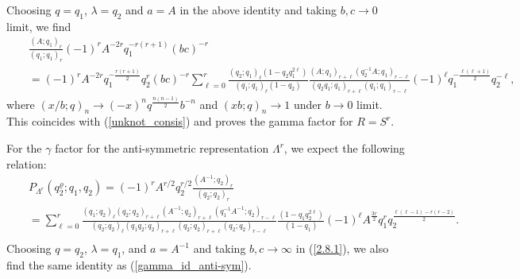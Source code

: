 \documentclass[hyper,letterpaper]{JHEP3}
\begin{document}
Choosing $q=q_1$, $\lambda=q_2$ and $a=A$ in the above identity and
taking $b,c\to 0$ limit, we find
\begin{eqnarray}
&&\frac{(A;q_1)_r}{(q_1;q_1)_r}(-1)^rA^{-2r}q_1^{-r(r+1)}(bc)^{-r}
\nonumber \\
&&=(-1)^rA^{-2r}q_1^{-\frac{r(r+1)}{2}}q_2^{r}(bc)^{-r}
\sum_{\ell=0}^r\frac{(q_2;q_1)_{\ell}(1-q_2q_1^{2\ell})}{(q_1;q_1)_{\ell}(1-q_2)}
\frac{(A;q_1)_{r+\ell}(q_2^{-1}A;q_1)_{r-\ell}}{(q_2q_1;q_1)_{r+\ell}(q_1;q_1)_{r-\ell}}
(-1)^{\ell}q_1^{-\frac{\ell(\ell+1)}{2}}q_2^{-\ell},
\nonumber
\end{eqnarray}
where $(x/b;q)_n\to (-x)^nq^{\frac{n(n-1)}{2}}b^{-n}$ and $(xb;q)_n\to 1$
under $b\to 0$ limit.
This coincides with (\ref{unknot_consis}) and proves the gamma factor
for $R=S^r$.

For the $\gamma$ factor for the anti-symmetric representation $\Lambda^r$,
we expect the following relation:
\begin{eqnarray}
&&P_{\Lambda^r}(q_2^{\varrho};q_1,q_2)=
(-1)^rA^{r/2}q_2^{r/2}\frac{(A^{-1};q_2)_r}{(q_2;q_2)_r}
\nonumber \\
&&
=\sum_{\ell=0}^r\frac{(q_1;q_2)_{\ell}(q_2;q_2)_{r+\ell}(A^{-1};q_2)_{r+\ell}(q_1^{-1}A^{-1};q_2)_{r-\ell}}
{(q_2;q_2)_{\ell}(q_1q_2;q_2)_{r+\ell}(q_2;q_2)_{r+\ell}(q_2;q_2)_{r-\ell}}\frac{(1-q_1q_2^{2\ell})}{(1-q_1)}
(-1)^{\ell}A^{\frac{3r}{2}}q_1^{r}q_2^{\frac{\ell(\ell-1)-r(r-2)}{2}}.
\nonumber \\
&&
\label{gamma_id_anti-sym}
\end{eqnarray}
Choosing $q=q_2$, $\lambda=q_1$, and $a=A^{-1}$ and taking $b,c\to\infty$
in (\ref{2.8.1}), we also find the same identity as (\ref{gamma_id_anti-sym}).



\end{document}
